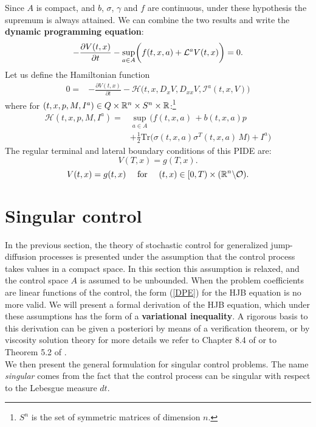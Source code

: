 Since $A$ is compact, and $b$, $\sigma$, $\gamma$ and $f$ are continuous, under these hypothesis the supremum is always attained.
We can combine the two results and write the \textbf{dynamic programming equation}:
\begin{equation}\label{DPE}
 -\frac{\partial V(t,x)}{\partial t} - \sup_{a \in A} \biggl( f(t,x,a) + \mathcal{L}^{a}V(t,x)  \biggr) = 0.
\end{equation}
Let us define the Hamiltonian function
\begin{align} \nonumber
 0 = & - \frac{\partial V(t,x)}{\partial t} - \mathcal{H}\bigl( t,x,D_x V, D_{xx} V, \mathcal{I}^a(t,x,V) \bigr) 
\end{align}
where for $(t,x,p,M,I^a) \in Q \times \mathbb{R}^n \times S^n \times \mathbb{R}$:\footnote{$S^n$ is the set of symmetric matrices of dimension $n$.} 
\begin{align}\label{Hamiltonian}
 \mathcal{H}(t,x,p,M,I^a) =& \sup_{a \in A} \biggl( f(t,x,a) \, + b(t,x,a) p \\ \nonumber
              &+ \frac{1}{2} \mbox{Tr} \bigl( \sigma(t,x,a)\sigma^T(t,x,a) \, M \bigr) +I^a \biggr) 
\end{align}
The regular terminal and lateral boundary conditions of this PIDE are: 
\begin{equation}\label{DPE_term_cond}
 V(T,x) = g(T,x).
\end{equation}
\begin{equation}\label{DPE_lateral_cond}
 V(t,x) = g(t,x) \quad \mbox{ for } \quad (t,x) \in [0,T)\times (\mathbb{R}^n \backslash \mathcal{O}). 
\end{equation}


\section{Singular control}\label{singular_control}

In the previous section, the theory of stochastic control for generalized jump-diffusion processes is presented under the assumption that the control process 
takes values in a compact space.
In this section this assumption is relaxed, and the control space $A$ is assumed to be unbounded.
When the problem coefficients are linear functions of the control, the form (\ref{DPE}) for the HJB equation is no more valid. 
We will present a formal derivation of the HJB equation, which under these assumptions has the form of 
a \textbf{variational inequality}. 
A rigorous basis to this derivation can be given a posteriori by means of a verification theorem, or by viscosity solution theory 
for more details we refer to Chapter 8.4 of \cite{FlemingSoner} or to Theorem 5.2 of \cite{OksendalSulem}. \\ 
We then present the general formulation for singular control problems.
The name \emph{singular} comes from the fact that the control process can be singular with respect to the Lebesgue measure $dt$.

